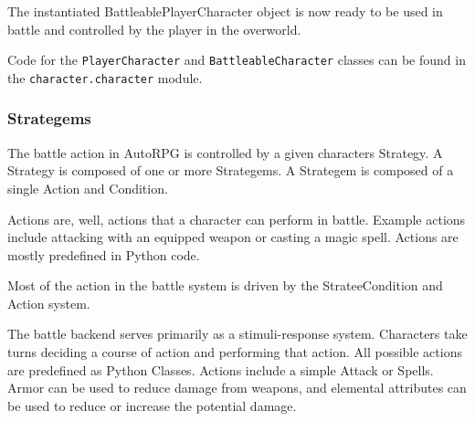 \documentclass[11pt]{article}
\begin{document}
The instantiated BattleablePlayerCharacter object is now ready to be used in battle and controlled by the player in the overworld.

Code for the \texttt{PlayerCharacter} and \texttt{BattleableCharacter} classes can be found in the \texttt{character.character} module.

\subsubsection{Strategems}

The battle action in AutoRPG is controlled by a given characters Strategy.  A Strategy is composed of one or more Strategems.  A Strategem is composed of a single Action and Condition.

Actions are, well, actions that a character can perform in battle.  Example actions include attacking with an equipped weapon or casting a magic spell.  Actions are mostly predefined in Python code.  

\singlespacing
{}
\doublespacing

Most of the action in the battle system is driven by the StrateeCondition and Action system. 

The battle backend serves primarily as a stimuli-response system.  Characters take turns deciding a course of action and performing that action.  All possible actions are predefined as Python Classes.  Actions include a simple Attack or Spells.  Armor can be used to reduce damage from weapons, and elemental attributes can be used to reduce or increase the potential damage.  
\end{document}
